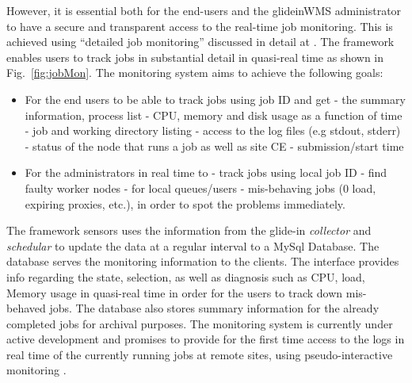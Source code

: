 \documentclass[a4paper]{jpconf}
\begin{document}
However, it is essential both for the end-users and the glideinWMS administrator to have 
a secure and transparent access to the real-time job monitoring. This is achieved using
``detailed job monitoring'' discussed in detail at \cite{bib:cms_jobmon}. The framework enables users to track jobs 
in substantial detail in quasi-real time as shown in Fig.~\ref{fig:jobMon}. The monitoring system aims to 
achieve the following goals:
\begin {itemize}
\item 
For the end users to be able to track jobs using job ID and get 
\subitem
- the summary information, process list
\subitem
- CPU, memory and disk usage as a function of time
\subitem
- job and working directory listing
\subitem
- access to the log files (e.g stdout, stderr)
\subitem
- status of the node that runs a job as well as site CE
\subitem
- submission/start time
\item
For the administrators in real time to
\subitem
 - track jobs using local job ID
\subitem
- find faulty worker nodes
\subitem
- for local queues/users
\subitem
- mis-behaving jobs (0 load, expiring proxies, etc.), in order to spot the problems immediately.
\end{itemize}
The framework sensors uses the information from the glide-in \emph{collector} and \emph{schedular} to
update the data at a regular interval to a MySql Database. The database serves the monitoring
information to the clients. The interface provides info regarding the state, selection, as well as 
diagnosis such as CPU, load, Memory usage in quasi-real time in order for the users to track down 
mis-behaved jobs. The database also stores summary information for the already completed jobs for archival 
purposes. The monitoring system is currently under active development and promises to provide for the first 
time access to the logs in real time of the currently running jobs at remote sites, using 
pseudo-interactive monitoring \cite{bib:pseudo_mon}.
\end{document}
